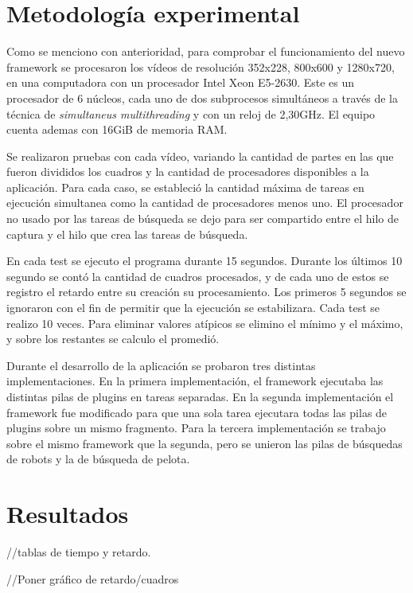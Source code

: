 
\section{Metodología experimental}

Como se menciono con anterioridad, para comprobar el funcionamiento del nuevo
framework se procesaron los vídeos de resolución 352x228, 800x600 y 1280x720, en
una computadora con un procesador Intel Xeon E5-2630. Este es un procesador de 6
núcleos, cada uno de dos subprocesos simultáneos a través de la técnica de
\emph{simultaneus multithreading} y con un reloj de 2,30GHz. El equipo cuenta
ademas con 16GiB de memoria RAM.

Se realizaron pruebas con cada vídeo, variando la cantidad de partes en las que
fueron divididos los cuadros y la cantidad de procesadores disponibles a la
aplicación. Para cada caso, se estableció la cantidad máxima de tareas en
ejecución simultanea como la cantidad de procesadores menos uno. El procesador
no usado por las tareas de búsqueda se dejo para ser compartido entre el hilo de
captura y el hilo que crea las tareas de búsqueda.

En cada test se ejecuto el programa durante 15 segundos. Durante los últimos 10
segundo se contó la cantidad de cuadros procesados, y de cada uno de estos se
registro el retardo entre su creación su procesamiento. Los primeros 5 segundos
se ignoraron con el fin de permitir que la ejecución se estabilizara. Cada test
se realizo 10 veces. Para eliminar valores atípicos se elimino el mínimo y el
máximo, y sobre los restantes se calculo el promedió.

Durante el desarrollo de la aplicación se probaron tres distintas
implementaciones. En la primera implementación, el framework ejecutaba las
distintas pilas de plugins en tareas separadas. En la segunda implementación el
framework fue modificado para que una sola tarea ejecutara todas las pilas de
plugins sobre un mismo fragmento. Para la tercera implementación se trabajo
sobre el mismo framework que la segunda, pero se unieron las pilas de búsquedas
de robots y la de búsqueda de pelota.

\section{Resultados}

//tablas de tiempo y retardo.

//Poner gráfico de retardo/cuadros
